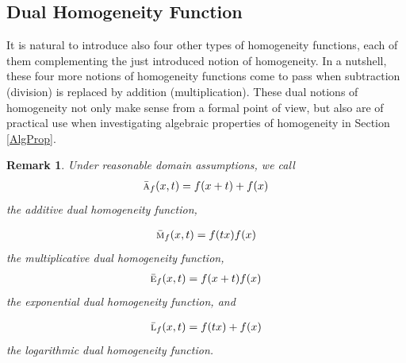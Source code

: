 \documentclass{amsart}
\theoremstyle{plain}
\newtheorem{remark}{Remark}
\numberwithin{equation}{section}
\newcommand{\mh}{\textsc{m}}
\newcommand{\ah}{\textsc{a}}
\newcommand{\lh}{\textsc{l}}
\newcommand{\eh}{\textsc{e}}
\begin{document}
\subsection{Dual Homogeneity Function}
It is natural to introduce also
four other types of homogeneity functions,
each of them complementing the just introduced notion of homogeneity.
In a nutshell, these four more notions of homogeneity functions 
come to pass when subtraction (division) is replaced by addition (multiplication).
These dual notions of homogeneity not only make sense 
from a formal point of view, but also are of practical use
when investigating algebraic properties of homogeneity
in Section \ref{AlgProp}.

\begin{remark}
Under reasonable domain assumptions, we call
\begin{align*}
\bar{\ah}_{f} (x,t)=f(x+t) + f(x)
\end{align*}	
 the \textit{additive dual homogeneity function},

\begin{align*}
	\bar{\mh}_{f} (x,t)={f(tx)}{f(x)}  
\end{align*}	
 the \textit{multiplicative dual homogeneity function},
\begin{align*}
	\bar{\eh}_{f} (x,t)={f(x+t)}{f(x)}  
\end{align*}	
 the \textit{exponential dual homogeneity function}, and

\begin{align*}
	\bar{\lh}_{f} (x,t)=f(tx) + f(x)  	
\end{align*}	
the \textit{logarithmic dual homogeneity function}.

\end{remark}
\end{document}
